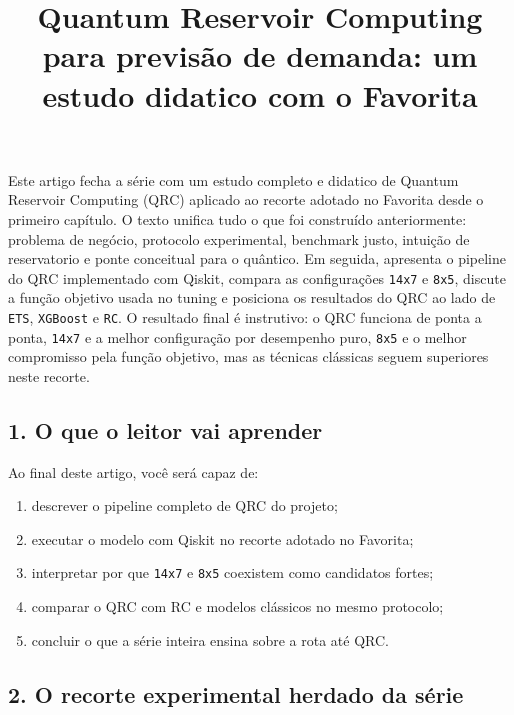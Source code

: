 \documentclass[12pt]{article}
\title{Quantum Reservoir Computing para previsão de demanda: um estudo didatico com o Favorita}
\author{}
\providecommand{\tightlist}{%
          \setlength{\itemsep}{0pt}\setlength{\parskip}{0pt}}
\begin{document}
        \maketitle

        \begin{resumo}
        Este artigo fecha a série com um estudo completo e didatico de Quantum Reservoir Computing (QRC) aplicado ao recorte adotado no Favorita desde o primeiro capítulo. O texto unifica tudo o que foi construído anteriormente: problema de negócio, protocolo experimental, benchmark justo, intuição de reservatorio e ponte conceitual para o quântico. Em seguida, apresenta o pipeline do QRC implementado com Qiskit, compara as configurações \texttt{14x7} e \texttt{8x5}, discute a função objetivo usada no tuning e posiciona os resultados do QRC ao lado de \texttt{ETS}, \texttt{XGBoost} e \texttt{RC}. O resultado final é instrutivo: o QRC funciona de ponta a ponta, \texttt{14x7} e a melhor configuração por desempenho puro, \texttt{8x5} e o melhor compromisso pela função objetivo, mas as técnicas clássicas seguem superiores neste recorte.
        \end{resumo}

        \subsection{1. O que o leitor vai aprender}\label{1-o-que-o-leitor-vai-aprender}

Ao final deste artigo, você será capaz de:

\begin{enumerate}
\def\labelenumi{\arabic{enumi}.}
\tightlist
\item
  descrever o pipeline completo de QRC do projeto;
\item
  executar o modelo com Qiskit no recorte adotado no Favorita;
\item
  interpretar por que \texttt{14x7} e \texttt{8x5} coexistem como candidatos fortes;
\item
  comparar o QRC com RC e modelos clássicos no mesmo protocolo;
\item
  concluir o que a série inteira ensina sobre a rota até QRC.
\end{enumerate}

\subsection{2. O recorte experimental herdado da série}\label{2-o-recorte-experimental-herdado-da-suxe9rie}
\end{document}
